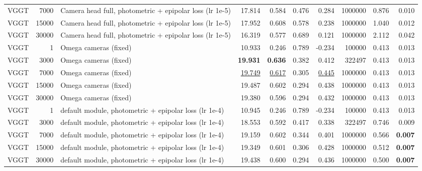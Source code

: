 \begin{table}[H]
\begin{tabular}{lrlrrrrrrr}
VGGT & 7000 & Camera head full, photometric + epipolar loss (lr 1e-5) & 17.814 & 0.584 & 0.476 & 0.284 & 1000000 & 0.876 & 0.010 \\
VGGT & 15000 & Camera head full, photometric + epipolar loss (lr 1e-5) & 17.952 & 0.608 & 0.578 & 0.238 & 1000000 & 1.040 & 0.012 \\
VGGT & 30000 & Camera head full, photometric + epipolar loss (lr 1e-5) & 16.319 & 0.577 & 0.689 & 0.121 & 1000000 & 2.112 & 0.042 \\
VGGT & 1 & Omega cameras (fixed) & 10.933 & 0.246 & 0.789 & -0.234 & 100000 & 0.413 & 0.013 \\
VGGT & 3000 & Omega cameras (fixed) & \textbf{19.931} & \textbf{0.636} & 0.382 & 0.412 & 322497 & 0.413 & 0.013 \\
VGGT & 7000 & Omega cameras (fixed) & \underline{19.749} & \underline{0.617} & 0.305 & \underline{0.445} & 1000000 & 0.413 & 0.013 \\
VGGT & 15000 & Omega cameras (fixed) & 19.487 & 0.602 & 0.294 & 0.438 & 1000000 & 0.413 & 0.013 \\
VGGT & 30000 & Omega cameras (fixed) & 19.380 & 0.596 & 0.294 & 0.432 & 1000000 & 0.413 & 0.013 \\
VGGT & 1 & default module, photometric + epipolar loss (lr 1e-4) & 10.945 & 0.246 & 0.789 & -0.234 & 100000 & 0.413 & 0.013 \\
VGGT & 3000 & default module, photometric + epipolar loss (lr 1e-4) & 18.553 & 0.592 & 0.417 & 0.338 & 322497 & 0.746 & 0.009 \\
VGGT & 7000 & default module, photometric + epipolar loss (lr 1e-4) & 19.159 & 0.602 & 0.344 & 0.401 & 1000000 & 0.566 & \textbf{0.007} \\
VGGT & 15000 & default module, photometric + epipolar loss (lr 1e-4) & 19.349 & 0.601 & 0.306 & 0.428 & 1000000 & 0.512 & \textbf{0.007} \\
VGGT & 30000 & default module, photometric + epipolar loss (lr 1e-4) & 19.438 & 0.600 & 0.294 & 0.436 & 1000000 & 0.500 & \textbf{0.007} \\
\bottomrule
\end{tabular}
\end{table}